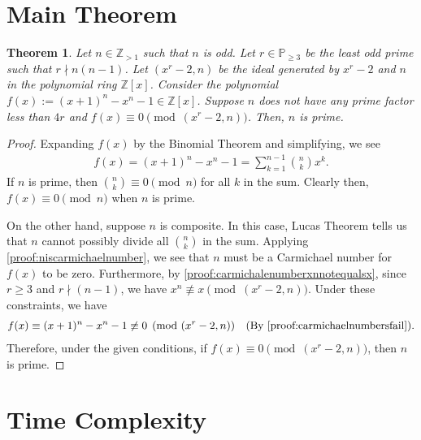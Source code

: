 \documentclass{article}
\theoremstyle{plain}
\newtheorem{theorem}{Theorem}[section]
\theoremstyle{definition}
\newcommand{\Z}{\mathbb{Z}}
\begin{document}
\section{Main Theorem} \label{section:maintheorem}
\begin{theorem} \label{proof:main}
Let $n \in \Z_{>1}$ such that $n$ is odd. Let $r \in \mathbb{P}_{\geq 3}$ be the least odd prime such that $r \nmid n (n-1)$. Let $(x^r-2, n)$ be the ideal generated by $x^r-2$ and $n$ in the polynomial ring $\Z[x]$. Consider the polynomial $f(x) := (x+1)^n - x^n - 1 \in \Z[x]$. Suppose $n$ does not have any prime factor less than $4r$ and $f(x) \equiv 0 \pmod{(x^r-2, n)}$. Then, $n$ is prime.
\end{theorem}
\begin{proof}
Expanding $f(x)$ by the Binomial Theorem and simplifying, we see
\begin{align*}
    f(x) = (x+1)^n - x^n - 1 = \sum_{k=1}^{n-1} \binom{n}{k} x^k .
\end{align*}
If $n$ is prime, then $\binom{n}{k} \equiv 0 \pmod{n}$ for all $k$ in the sum. Clearly then, $f(x) \equiv 0 \pmod{n}$ when $n$ is prime.

On the other hand, suppose $n$ is composite. In this case, Lucas Theorem tells us that $n$ cannot possibly divide all $\binom{n}{k}$ in the sum. Applying \cref{proof:niscarmichaelnumber}, we see that $n$ must be a Carmichael number for $f(x)$ to be zero. Furthermore,  by \cref{proof:carmichalenumberxnnotequalsx}, since $r \geq 3$ and $r \nmid (n-1)$, we have $x^n \not\equiv x \pmod{(x^r-2,n)}$. Under these constraints, we have
\begin{align*}
    f(x) \equiv (x+1)^n - x^n - 1 \not\equiv 0 \pmod{(x^r-2, n)} \quad \text{(By \cref{proof:carmichaelnumbersfail})} .
\end{align*}
Therefore, under the given conditions, if $f(x) \equiv 0 \pmod{(x^r-2, n)}$, then $n$ is prime.
\end{proof}

\section{Time Complexity}
\end{document}
